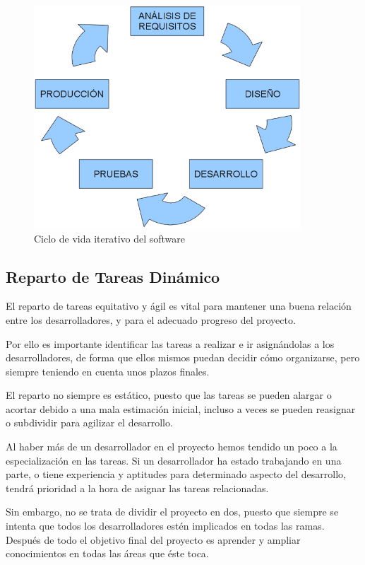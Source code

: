 \begin{figure}[H]
 \centering
 \includegraphics[width=100mm]{figuras/cap5/iterative.png}
 \caption{Ciclo de vida iterativo del software}
\end{figure}

\subsection*{Reparto de Tareas Dinámico}

El reparto de tareas equitativo y ágil es vital para mantener una buena
relación entre los desarrolladores, y para el adecuado progreso del proyecto.

Por ello es importante identificar las tareas a realizar e ir asignándolas a
los desarrolladores, de forma que ellos mismos puedan decidir cómo organizarse,
pero siempre teniendo en cuenta unos plazos finales.

El reparto no siempre es estático, puesto que las tareas se pueden alargar o
acortar debido a una mala estimación inicial, incluso a veces se pueden
reasignar o subdividir para agilizar el desarrollo.

Al haber más de un desarrollador en el proyecto hemos tendido un poco a la
especialización en las tareas. Si un desarrollador ha estado trabajando en una
parte, o tiene experiencia y aptitudes para determinado aspecto del desarrollo,
tendrá prioridad a la hora de asignar las tareas relacionadas.

Sin embargo, no se trata de dividir el proyecto en dos, puesto que siempre se
intenta que todos los desarrolladores estén implicados en todas las ramas.
Después de todo el objetivo final del proyecto es aprender y ampliar
conocimientos en todas las áreas que éste toca.

